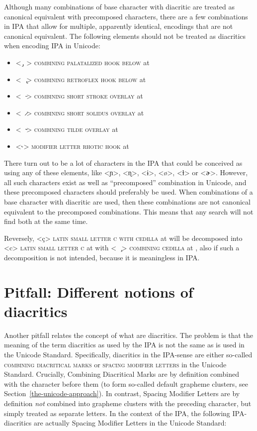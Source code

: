 Although many combinations of base character with diacritic are treated as 
canonical equivalent with precomposed characters, there are a few combinations 
in IPA that allow for multiple, apparently identical, encodings that are not 
canonical equivalent. The following elements should not be treated as diacritics 
when encoding IPA in Unicode:
\begin{itemize}
  \item[] <\ {\large  ̡}\ > \textsc{combining palatalized hook below} at 
  \item[] <\ \ {\large  ̢}> \textsc{combining retroflex hook below} at 
  \item[] <\ \ {\large  ̵}> \textsc{combining short stroke overlay} at 
  \item[] <\ \ {\large  ̷}> \textsc{combining short solidus overlay} at 
  \item[] <\ \ {\large  ̴}> \textsc{combining tilde overlay} at 
  \item[] <{\large ˞}> \textsc{modifier letter rhotic hook} at 
\end{itemize} 

There turn out to be a lot of characters in the IPA that could be conceived as 
using any of these elements, like <ɲ>, <ɳ>, <ɨ>, <ø>, <ɫ> or <ɚ>. However, all 
such characters exist as well as ``precomposed'' combination in Unicode, and these 
precomposed characters should preferably be used. When combinations of a base 
character with diacritic are used, then these combinations are not canonical 
equivalent to the precomposed combinations. This means that any search will not 
find both at the same time.

Reversely, <ç> \textsc{latin small letter c with cedilla} at  will be
decomposed into <c> \textsc{latin small letter c} at  with 
<\ \ {\large  ̧}> \textsc{combining cedilla} at , 
also if such a decomposition is not intended, because it is meaningless in 
IPA.\@

\section{Pitfall: Different notions of diacritics}
\label{pitfall-different-notions-of-diacritics}

Another pitfall relates the concept of what are diacritics. The problem is that
the meaning of the term diacritics as used by the IPA is not the same as is used
in the Unicode Standard. Specifically, diacritics in the IPA-sense are either
so-called \textsc{combining diacritical marks} or \textsc{spacing modifier
letters} in the Unicode Standard. Crucially, Combining Diacritical Marks are by
definition combined with the character before them (to form so-called default
grapheme clusters, see Section~\ref{the-unicode-approach}). In contrast, Spacing
Modifier Letters are by definition \emph{not} combined into grapheme clusters
with the preceding character, but simply treated as separate letters. In the
context of the IPA, the following IPA-diacritics are actually Spacing Modifier
Letters in the Unicode Standard:

